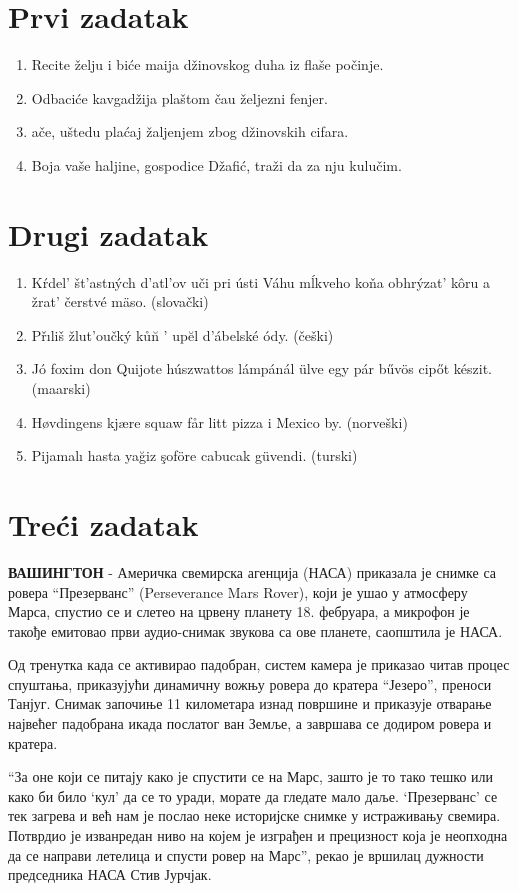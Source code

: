 \documentclass{article}
\begin{document}
	\section{Prvi zadatak}
	\begin{enumerate}
		\item Recite \v zelju i bi\' ce ma\dj ija d\v zinovskog duha iz fla\v se po\v cinje.
		\item Odbaci\' ce kavgad\v zija pla\v stom \v ca\dj u \v zeljezni fenjer.
		\item \DJ a\v ce, u\v stedu pla\' caj \v zaljenjem zbog d\v zinovskih cifara.
		\item Boja va\v se haljine, gospodice D\v zafi\' c, tra\v zi da za nju kulu\v cim.
	\end{enumerate}

	\section{Drugi zadatak}
	\begin{enumerate}
		\item K\' rdel' \v st'astn\' ych d'atl'ov u\v ci pri \' usti V\' ahu m\' lkveho ko\v na obhr\' yzat' k\^ oru a \v zrat' \v cerstv\' e m\" aso. (slova\v cki)
		\item P\v r\i li\v s \v zlut'ou\v ck\' y k\r u\u n ' up\u el d'\' abelsk\' e \' ody. (\v ce\v ski)
		\item J\' o foxim don Quijote h\' uszwattos l\' amp\' an\' al \" ulve egy p\' ar b\H uv\" os cip\H ot k\' eszit. (ma\dj arski)
		\item H\o vdingens kj\ae re squaw f\r ar litt pizza i Mexico by. (norve\v ski)
		\item Pijamal{\i} hasta ya\u giz \c sof\" ore cabucak g\" uvendi. (turski)
	\end{enumerate}

	\section{Tre\' ci zadatak}
	\textbf{ВАШИНГТОН} - Америчка свемирска агенција (НАСА) приказала је снимке са ровера ``Презерванс'' (Perseverance Mars Rover), 
	који је ушао у атмосферу Марса, спустио се и слетео на црвену планету 18. фебруара, а микрофон је такође емитовао први 
	аудио-снимак звукова са ове планете, саопштила је НАСА.

	Од тренутка када се активирао падобран, систем камера је приказао читав процес спуштања, приказујући динамичну вожњу ровера 
	до кратера ``Језеро'', преноси Танјуг. Снимак започиње 11 километара изнад површине и приказује отварање највећег падобрана 
	икада послатог ван Земље, а завршава се додиром ровера и кратера.

	``За оне који се питају како је спустити се на Марс, зашто је то тако тешко или како би било `кул' да се то уради, морате да 
	гледате мало даље. `Презерванс' се тек загрева и већ нам је послао неке историјске снимке у истраживању свемира. Потврдио је 
	изванредан ниво на којем је изграђен и прецизност која је неопходна да се направи летелица и спусти ровер на Марс'', рекао је 
	вршилац дужности председника НАСА Стив Јурчјак.
\end{document}

